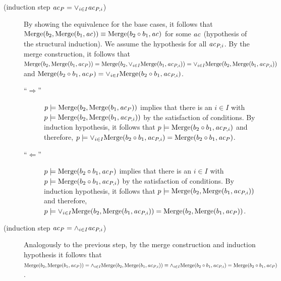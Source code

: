 \begin{description}
\item[(induction step $\mathit{ac}_P = \vee_{i \in I} \mathit{ac}_{P,i}$)]
By showing the equivalence for the base cases, it follows that $\mathrm{Merge}(b_2,\mathrm{Merge}(b_1,\mathit{ac})) \equiv \mathrm{Merge}(b_2 \circ b_1, \mathit{ac})$ for some $\mathit{ac}$ (hypothesis of the structural induction).
We assume the hypothesis for all $\mathit{ac}_{P,i}$.
By the merge construction, it follows that $\mathrm{Merge}(b_2,\mathrm{Merge}(b_1,\mathit{ac}_P))=\mathrm{Merge}(b_2,\vee_{i \in I}\mathrm{Merge}(b_1,\mathit{ac}_{P,i}))=\vee_{i \in I}\mathrm{Merge}(b_2,\mathrm{Merge}(b_1,\mathit{ac}_{P,i}))$ and $\mathrm{Merge}(b_2 \circ b_1,\mathit{ac}_P)=\vee_{i \in I}\mathrm{Merge}(b_2 \circ b_1,\mathit{ac}_{P,i})$.
\begin{description}
\item[``$\Rightarrow$'']
$p \models \mathrm{Merge}(b_2,\mathrm{Merge}(b_1,\mathit{ac}_P))$ implies that there is an $i \in I$ with $p \models \mathrm{Merge}(b_2,\mathrm{Merge}(b_1,\mathit{ac}_{P,i}))$ by the satisfaction of conditions.
By induction hypothesis, it follows that $p \models \mathrm{Merge}(b_2 \circ b_1, \mathit{ac}_{P,i})$ and therefore, $p \models \vee_{i \in I}\mathrm{Merge}(b_2 \circ b_1,\mathit{ac}_{P,i})=\mathrm{Merge}(b_2 \circ b_1, \mathit{ac}_P)$.
\item[``$\Leftarrow$'']
$p \models \mathrm{Merge}(b_2 \circ b_1,\mathit{ac}_P)$ implies that there is an $i \in I$ with $p \models \mathrm{Merge}(b_2 \circ b_1,\mathit{ac}_{P,i})$ by the satisfaction of conditions.
By induction hypothesis, it follows that $p \models \mathrm{Merge}(b_2, \mathrm{Merge}(b_1, \mathit{ac}_{P,i}))$ and therefore, $p \models \vee_{i \in I}\mathrm{Merge}(b_2,\mathrm{Merge}(b_1,\mathit{ac}_{P,i}))=\mathrm{Merge}(b_2,\mathrm{Merge}(b_1, \mathit{ac}_P))$.
\end{description}

\item[(induction step $\mathit{ac}_P = \wedge_{i \in I} \mathit{ac}_{P,i}$)]
Analogously to the previous step, by the merge construction and induction hypothesis it follows that $\mathrm{Merge}(b_2,\mathrm{Merge}(b_1,\mathit{ac}_P))=\wedge_{i \in I}\mathrm{Merge}(b_2,\mathrm{Merge}(b_1,\mathit{ac}_{P,i})) \equiv \wedge_{i \in I}\mathrm{Merge}(b_2 \circ b_1,\mathit{ac}_{P,i})=\mathrm{Merge}(b_2 \circ b_1,\mathit{ac}_P)$.


\end{description}
